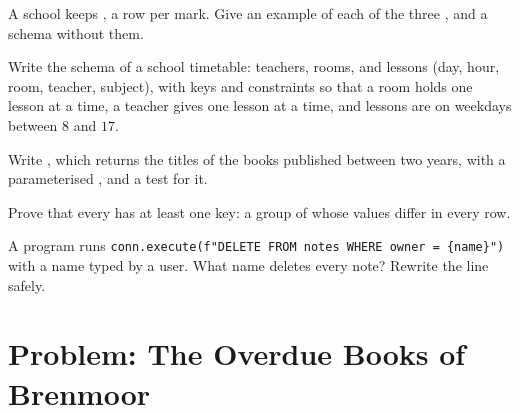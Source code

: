 \begin{exercise}[$\star\star$]\label{exo:g12:relational-databases-sql:11}
A school keeps , a row per mark. Give an example
of each of the three , and a schema without them.
\end{exercise}

\begin{exercise}[$\star\star\star$]\label{exo:g12:relational-databases-sql:12}
Write the schema of a school timetable: teachers, rooms, and lessons (day, hour, room, teacher, subject), with keys
and constraints so that a room holds one lesson at a time, a teacher gives one lesson at a time, and lessons are on
weekdays between $8$ and $17$.
\end{exercise}

\begin{exercise}[$\star\star\star$]\label{exo:g12:relational-databases-sql:13}
Write , which returns the titles of the books published between two years,
with a parameterised , and a test for it.
\end{exercise}

\begin{exercise}[$\star\star\star$]\label{exo:g12:relational-databases-sql:14}
Prove that every  has at least one key: a group of  whose values differ in every row.
\end{exercise}

\begin{exercise}[$\star\star\star$]\label{exo:g12:relational-databases-sql:15}
A program runs \texttt{conn.execute(f"DELETE FROM notes WHERE owner = \textquotesingle{}\{name\}\textquotesingle{}")} with a name typed by a user. What name
deletes every note? Rewrite the line safely.
\end{exercise}

\section{Problem: The Overdue Books of Brenmoor}\label{sec:g12:relational-databases-sql:problem}

